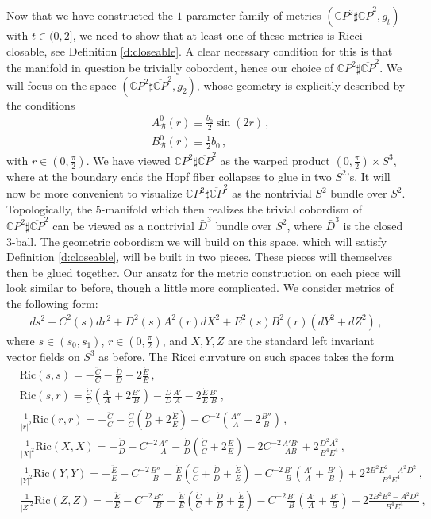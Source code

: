 \documentclass[11pt]{article}
\newcommand{\Ric}{\text{Ric}}
\newcommand{\CC}{\mathds{C}}
\newcommand{\cB}{\mathcal{B}}
\begin{document}
Now that we have constructed the $1$-parameter family of metrics $(\CC P^2\sharp \overline{\CC P}^2,g_t)$ with $t\in (0,2]$, we need to show that at least one of these metrics is Ricci closable, see Definition \ref{d:closeable}.  A clear necessary condition for this is that the manifold in question be trivially cobordent, hence our choice of $\CC P^2\sharp \overline{\CC P}^2$.  We will focus on the space $(\CC P^2\sharp\overline{\CC P}^2,g_2)$, whose geometry is explicitly described by the conditions
\begin{align}\label{e:B0}
&A^0_\cB(r) \equiv \frac{b_0}{2}\sin(2r)\, , \\
&B^0_\cB(r) \equiv \frac{1}{2}b_0\, ,
\end{align}
with $r\in (0,\frac{\pi}{2})$.  We have viewed $\CC P^2\sharp \overline{\CC P}^2$ as the warped product $(0,\frac{\pi}{2})\times S^3$, where at the boundary ends the Hopf fiber collapses to glue in two $S^2$'s.  It will now be more convenient to visualize $\CC P^2\sharp \overline{\CC P}^2$ as the nontrivial $S^2$ bundle over $S^2$.  Topologically, the $5$-manifold which then realizes the trivial cobordism of $\CC P^2\sharp \overline{\CC P}^2$ can be viewed as a nontrivial $\bar D^3$ bundle over $S^2$, where $\bar D^3$ is the closed $3$-ball.  The geometric cobordism we will build on this space, which will satisfy Definition \ref{d:closeable}, will be built in two pieces.  These pieces will themselves then be glued together.  Our ansatz for the metric construction on each piece will look similar to before, though a little more complicated.  We consider metrics of the following form:
\begin{align}
 ds^2+C^2(s)dr^2+D^2(s)A^2(r)dX^2+E^2(s)B^2(r)\left(dY^2+dZ^2\right)\, ,
\end{align}
where $s\in (s_0,s_1)$, $r\in(0,\frac{\pi}{2})$, and $X,Y,Z$ are the standard left invariant vector fields on $S^3$ as before.  The Ricci curvature on such spaces takes the form
\begin{align}\label{e:Riccicomputations3}
&\Ric(s,s) = -\frac{\ddot C}{C}-\frac{\ddot D}{D}-2\frac{\ddot E}{E}\, ,\\
&\Ric(s,r) = \frac{\dot C}{C}\left(\frac{A'}{A}+2\frac{B'}{B}\right)-\frac{\dot D}{D}\frac{A'}{A}-2\frac{\dot E}{E}\frac{B'}{B}\, ,\\
&\frac{1}{|r|^2}\Ric(r,r) = -\frac{\ddot C}{C}-\frac{\dot C}{C}\left(\frac{\dot D}{D}+2\frac{\dot E}{E}\right)-C^{-2}\left(\frac{A''}{A}+2\frac{B''}{B}\right)\, ,\\
&\frac{1}{|X|^2}\Ric(X,X) = -\frac{\ddot D}{D}-C^{-2}\frac{A''}{A}-\frac{\dot D}{D}\left(\frac{\dot C}{C}+2\frac{\dot E}{E}\right)-2C^{-2}\frac{A'B'}{AB}+2\frac{D^2A^2}{B^4E^4}\, , \\
&\frac{1}{|Y|^2}\Ric(Y,Y) = -\frac{\ddot E}{E}-C^{-2}\frac{B''}{B}-\frac{\dot E}{E}\left(\frac{\dot C}{C}+\frac{\dot D}{D}+\frac{\dot E}{E}\right)-C^{-2}\frac{B'}{B}\left(\frac{A'}{A}+\frac{B'}{B}\right)+2\frac{2B^2E^2-A^2D^2}{B^4E^4}\, ,\\
&\frac{1}{|Z|^2}\Ric(Z,Z) = -\frac{\ddot E}{E}-C^{-2}\frac{B''}{B}-\frac{\dot E}{E}\left(\frac{\dot C}{C}+\frac{\dot D}{D}+\frac{\dot E}{E}\right)-C^{-2}\frac{B'}{B}\left(\frac{A'}{A}+\frac{B'}{B}\right)+2\frac{2B^2E^2-A^2D^2}{B^4E^4}\, ,
\end{align}
\end{document}
